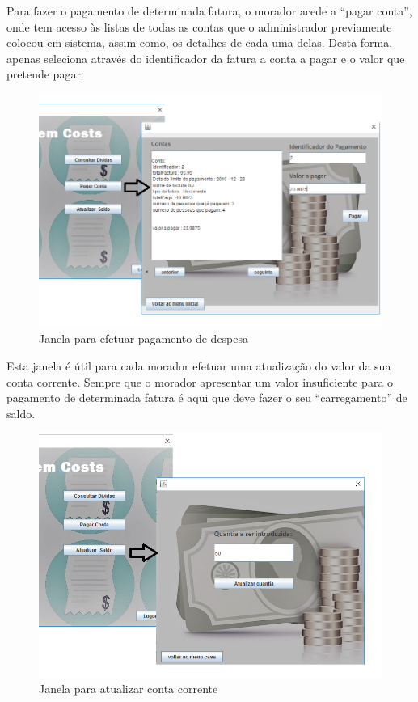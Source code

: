 \clearpage

Para fazer o pagamento de determinada fatura, o morador acede a “pagar conta”, onde tem acesso às listas de todas as contas que o administrador previamente colocou em sistema, assim como, os detalhes de cada uma delas.  Desta forma, apenas seleciona através do identificador da fatura a conta a pagar e o valor que pretende pagar.


\begin{figure}[h!]
	\centering
	\includegraphics[scale=0.5]{imagens/interface/pagarcontamorador}  
	\caption{Janela para efetuar pagamento de despesa}  
\end{figure}

Esta janela é útil para cada morador efetuar uma atualização do valor da sua conta corrente. Sempre que o morador apresentar um valor insuficiente para o pagamento de determinada fatura é aqui que deve fazer o seu “carregamento” de saldo. 

\begin{figure}[h!]
	\centering
	\includegraphics[scale=0.5]{imagens/interface/atualizarsaldomorador}  
	\caption{Janela para atualizar conta corrente}  
\end{figure}


















